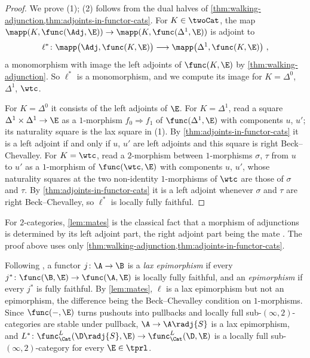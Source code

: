 \begin{proof}
We prove (1); (2) follows from the dual halves of \cref{thm:walking-adjunction,thm:adjoints-in-functor-cats}.
For $K \in \twoCat$, the map $\mapp(K,\func(\Adj,\E)) \to \mapp(K,\func(\Delta^{1},\E))$ is adjoint to
\[
\ell^{*}\colon \mapp\bigl(\Adj,\func(K,\E)\bigr) \longrightarrow \mapp\bigl(\Delta^{1},\func(K,\E)\bigr) \ ,
\]
a monomorphism with image the left adjoints of $\func(K,\E)$ by \cref{thm:walking-adjunction}. So $\ell^{*}$ is a monomorphism, and we compute its image for $K = \Delta^{0}$, $\Delta^{1}$, $\wtc$.

For $K = \Delta^{0}$ it consists of the left adjoints of $\E$.
For $K = \Delta^{1}$, read a square $\Delta^{1} \times \Delta^{1} \to \E$ as a $1$-morphism $f_{0} \Rightarrow f_{1}$ of $\func(\Delta^{1},\E)$ with components $u$, $u'$; its naturality square is the lax square in (1). By \cref{thm:adjoints-in-functor-cats} it is a left adjoint if and only if $u$, $u'$ are left adjoints and this square is right Beck--Chevalley.
For $K = \wtc$, read a $2$-morphism between $1$-morphisms $\sigma$, $\tau$ from $u$ to $u'$ as a $1$-morphism of $\func(\wtc,\E)$ with components $u$, $u'$, whose naturality squares at the two non-identity $1$-morphisms of $\wtc$ are those of $\sigma$ and $\tau$. By \cref{thm:adjoints-in-functor-cats} it is a left adjoint whenever $\sigma$ and $\tau$ are right Beck--Chevalley, so $\ell^{*}$ is locally fully faithful.
\end{proof}

\begin{rmk}
\label{rmk:mates-2cat}
For $2$-categories, \cref{lem:mates} is the classical fact that a morphism of adjunctions is determined by its left adjoint part, the right adjoint part being the mate \cite{kellystreet1974review}. The proof above uses only \cref{thm:walking-adjunction,thm:adjoints-in-functor-cats}.
\end{rmk}

\begin{rmk}
\label{rmk:lax-epi}
Following \cite{adamekelbashirsobralvelebil2001laxepi}, a functor $j\colon \A \to \B$ is a \emph{lax epimorphism} if every $j^{*}\colon \func(\B,\E) \to \func(\A,\E)$ is locally fully faithful, and an \emph{epimorphism} if every $j^{*}$ is fully faithful. By \cref{lem:mates}, $\ell$ is a lax epimorphism but not an epimorphism, the difference being the Beck--Chevalley condition on $1$-morphisms.
Since $\func(-,\E)$ turns pushouts into pullbacks and locally full sub-$(\infty,2)$-categories are stable under pullback, $\A \to \A\radj{S}$ is a lax epimorphism, and $L^{*}\colon \func^{L}_{\Cat}(\D\radj{S},\E) \to \func^{L}_{\Cat}(\D,\E)$ is a locally full sub-$(\infty,2)$-category for every $\E \in \tprl$.
\end{rmk}
